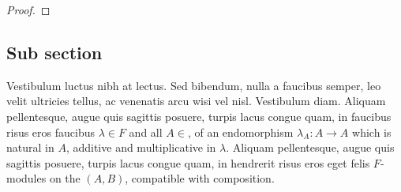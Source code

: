 \begin{lemma}\label{appa:proA.7}
\lipsum[5]
\end{lemma}

\lipsum[5]

\begin{proof}
\lipsum[5]
\end{proof}

\subsection{Sub section}
\label{appa:secA.1.4}

\begin{definition}\lipsum[5]
\end{definition}

Vestibulum luctus nibh at lectus. Sed bibendum, nulla a faucibus semper, leo
velit ultricies tellus, ac venenatis arcu wisi vel nisl. Vestibulum diam. Aliquam pellentesque,
augue quis sagittis posuere, turpis lacus congue quam, in faucibus risus eros faucibus $\lambda\in F$ and all $A\in $, of an endomorphism $\lambda_A:A\to A$ which is natural in $A$, additive and multiplicative in $\lambda$. Aliquam pellentesque,
augue quis sagittis posuere, turpis lacus congue quam, in hendrerit risus eros eget felis $F$-modules on the $(A,B)$, compatible with composition.

\begin{lemma}\lipsum[5]
\end{lemma}
